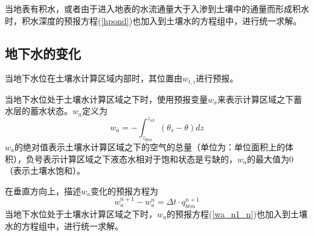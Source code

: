 当地表有积水，或者由于进入地表的水流通量大于入渗到土壤中的通量而形成积水时，积水深度的预报方程(\ref{hpond})也加入到土壤水的方程组中，进行统一求解。


\subsection{地下水的变化}
当地下水位在土壤水计算区域内部时，其位置由$w_{t,i}$进行预报。

当地下水位处于土壤水计算区域之下时，使用预报变量$w_a$来表示计算区域之下蓄水层的蓄水状态。$w_a$定义为
\begin{equation}
w_{a}=-\int_{z_{btm}}^{z_{wt}}\left(\theta_{s}-\theta\right) d z
\end{equation}
$w_a$的绝对值表示土壤水计算区域之下的空气的总量（单位为：单位面积上的体积），负号表示计算区域之下液态水相对于饱和状态是亏缺的，$w_a$的最大值为0（表示土壤水饱和）。

在垂直方向上，描述$w_a$变化的预报方程为
\begin{equation}\label{wa_n1_n}
w_{a}^{n+1}-w_{a}^{n}=\Delta t \cdot q_{b t m}^{n+1}
\end{equation}
当地下水位处于土壤水计算区域之下时，$w_a$的预报方程(\ref{wa_n1_n})也加入到土壤水的方程组中，进行统一求解。

